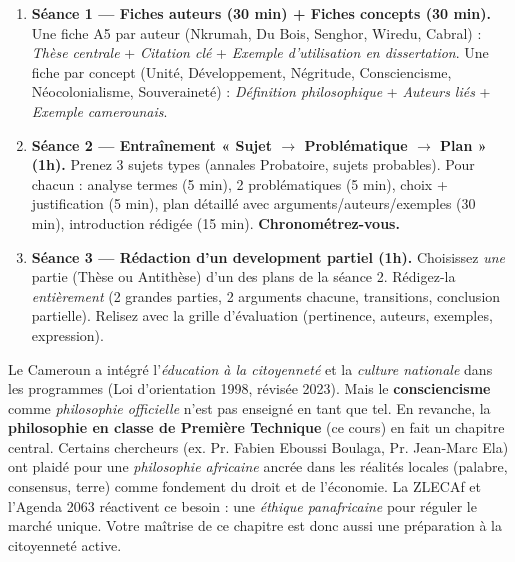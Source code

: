 \documentclass[11pt]{article}
\begin{document}
\begin{methode}
\begin{enumerate}
    \item \textbf{Séance 1 — Fiches auteurs (30 min) + Fiches concepts (30 min).} Une fiche A5 par auteur (Nkrumah, Du Bois, Senghor, Wiredu, Cabral) : \emph{Thèse centrale} + \emph{Citation clé} + \emph{Exemple d'utilisation en dissertation}. Une fiche par concept (Unité, Développement, Négritude, Consciencisme, Néocolonialisme, Souveraineté) : \emph{Définition philosophique} + \emph{Auteurs liés} + \emph{Exemple camerounais}.
    \item \textbf{Séance 2 — Entraînement « Sujet $\rightarrow$ Problématique $\rightarrow$ Plan » (1h).} Prenez 3 sujets types (annales Probatoire, sujets probables). Pour chacun : analyse termes (5 min), 2 problématiques (5 min), choix + justification (5 min), plan détaillé avec arguments/auteurs/exemples (30 min), introduction rédigée (15 min). \textbf{Chronométrez-vous.}
    \item \textbf{Séance 3 — Rédaction d'un development partiel (1h).} Choisissez \emph{une} partie (Thèse ou Antithèse) d'un des plans de la séance 2. Rédigez-la \emph{entièrement} (2 grandes parties, 2 arguments chacune, transitions, conclusion partielle). Relisez avec la grille d'évaluation (pertinence, auteurs, exemples, expression).
\end{enumerate}
\end{methode}

\begin{savaistu}
Le Cameroun a intégré l'\emph{éducation à la citoyenneté} et la \emph{culture nationale} dans les programmes (Loi d'orientation 1998, révisée 2023). Mais le \textbf{consciencisme} comme \emph{philosophie officielle} n'est pas enseigné en tant que tel. En revanche, la \textbf{philosophie en classe de Première Technique} (ce cours) en fait un chapitre central. Certains chercheurs (ex. Pr. Fabien Eboussi Boulaga, Pr. Jean-Marc Ela) ont plaidé pour une \emph{philosophie africaine} ancrée dans les réalités locales (palabre, consensus, terre) comme fondement du droit et de l'économie. La ZLECAf et l'Agenda 2063 réactivent ce besoin : une \emph{éthique panafricaine} pour réguler le marché unique. Votre maîtrise de ce chapitre est donc aussi une préparation à la citoyenneté active.
\end{savaistu}
\end{document}
